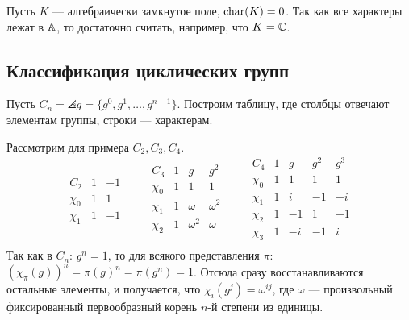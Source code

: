 Пусть $K$ --- алгебраически замкнутое поле, $\operatorname{char}(K) = 0$.
Так как все характеры лежат в $\mathbb{A}$, то достаточно считать, например, что $K = \mathbb{C}$.

\subsection{Классификация циклических групп}
Пусть $C_n = \angles{g} = \{g^0, g^1, \dots, g^{n - 1}\}$.
Построим таблицу, где столбцы отвечают элементам группы, строки --- характерам.

Рассмотрим для примера $C_2, C_3, C_4$.
\[\begin{array}{c|cc}
      C_2    & 1 & -1 \\\hline
      \chi_0 & 1 & 1  \\
      \chi_1 & 1 & -1
\end{array} \qquad
\begin{array}{c|ccc}
    C_3    & 1 & g        & g^2      \\\hline
    \chi_0 & 1 & 1        & 1        \\
    \chi_1 & 1 & \omega   & \omega^2 \\
    \chi_2 & 1 & \omega^2 & \omega   \\
\end{array} \qquad
\begin{array}{c|cccc}
    C_4    & 1 & g  & g^2 & g^3 \\\hline
    \chi_0 & 1 & 1  & 1   & 1   \\
    \chi_1 & 1 & i  & -1  & -i  \\
    \chi_2 & 1 & -1 & 1   & -1  \\
    \chi_3 & 1 & -i & -1  & i   \\
\end{array}\]
Так как в $C_n$: $g^n = 1$, то для всякого представления $\pi$: $(\chi_\pi(g))^n = \pi(g)^n = \pi(g^n) = 1$.
Отсюда сразу восстанавливаются остальные элементы, и получается, что $\chi_i(g^j) = \omega^{ij}$, где $\omega$ --- произвольный фиксированный первообразный корень $n$-й степени из единицы.

